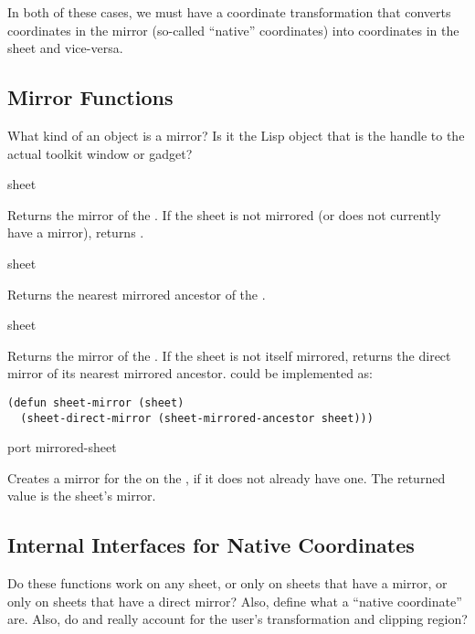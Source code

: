 In both of these cases, we must have a coordinate transformation that converts
coordinates in the mirror (so-called ``native'' coordinates) into coordinates
in the sheet and vice-versa.


\subsection {Mirror Functions}

 {What kind of an object is a mirror?  Is it the Lisp object that is
the handle to the actual toolkit window or gadget?}

 {sheet}

Returns the mirror of the  .  If the sheet is not
mirrored (or does not currently have a mirror),  returns
.

 {sheet}

Returns the nearest mirrored ancestor of the  .

 {sheet}

Returns the mirror of the  .  If the sheet is not itself
mirrored,  returns the direct mirror of its nearest mirrored
ancestor.   could be implemented as:

\begin{verbatim}
(defun sheet-mirror (sheet)
  (sheet-direct-mirror (sheet-mirrored-ancestor sheet)))
\end{verbatim}

 {port mirrored-sheet}

Creates a mirror for the   on the 
, if it does not already have one.  The returned value is the sheet's
mirror.


\subsection {Internal Interfaces for Native Coordinates}

 {Do these functions work on any sheet, or only on sheets that have
a mirror, or only on sheets that have a direct mirror?  Also, define what a
``native coordinate'' are.  Also, do  and
 really account for the user's transformation and
clipping region?}

